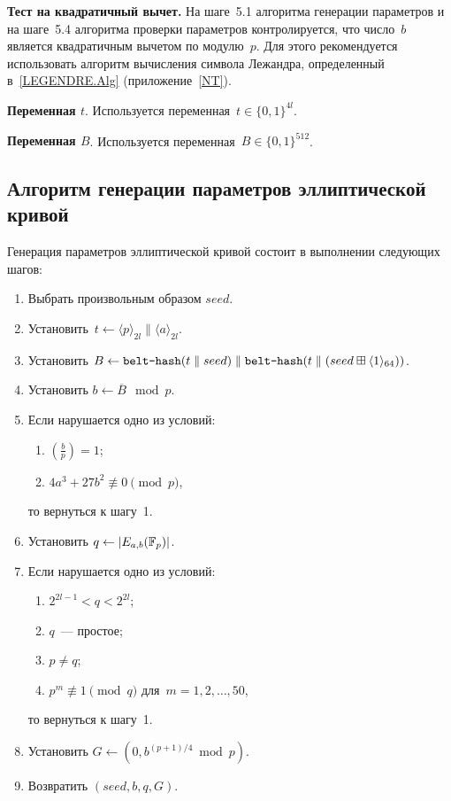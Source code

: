 {\bf Тест на квадратичный вычет.}
На шаге~5.1 алгоритма генерации параметров и на шаге~5.4
алгоритма проверки параметров контролируется, 
что число~$b$ является квадратичным вычетом
по модулю~$p$.
%
Для этого рекомендуется
использовать алгоритм вычисления символа Лежандра,
определенный в~\ref{LEGENDRE.Alg}
(приложение~\ref{NT}).

{\bf Переменная $t$}.
Используется переменная~$t\in\{0,1\}^{4l}$.

{\bf Переменная $B$}.
Используется переменная~$B\in\{0,1\}^{512}$.

\subsection{Алгоритм генерации параметров эллиптической кривой}\label{GENEC}

Генерация параметров эллиптической кривой состоит в выполнении 
следующих шагов:
\begin{enumerate}
\item
Выбрать произвольным образом $seed$.

\item
Установить~$t\leftarrow \langle p\rangle_{2l}\parallel \langle a\rangle_{2l}$.

\item
Установить
$B\leftarrow 
\texttt{belt-hash}(t\parallel seed)
\parallel
\texttt{belt-hash}(t\parallel 
(seed\boxplus\langle 1\rangle_{64}))$.

\item
Установить $b\leftarrow \overline{B}\mod p$.

\item
Если нарушается одно из условий:
\begin{enumerate}
\item
$\left(\frac{b}{p}\right)=1$;
\item
$4a^3+27b^2\not\equiv 0\pmod{p}$,
\end{enumerate}
то вернуться к шагу~1.

\item
Установить $q\leftarrow |E_{a,b}(\mathbb{F}_p)|$.

\item
Если нарушается одно из условий:
\begin{enumerate}
\item
$2^{2l-1}<q<2^{2l}$;
\item
$q$~--- простое;
\item
$p\neq q$;
\item
$p^m\not\equiv 1\pmod{q}$ для~$m=1,2,\ldots,50$,
\end{enumerate}
то вернуться к шагу~1.

\item
Установить $G\leftarrow (0,b^{(p+1)/4}\bmod p)$.

\item
Возвратить $(seed,b,q,G)$.
\end{enumerate}

